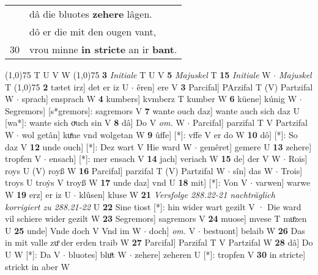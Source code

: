 \documentclass[8pt,a4paper,notitlepage]{article}
\begin{document}
\begin{table}[ht]
\begin{minipage}[t]{0.5\linewidth}
\begin{tabular}{rl}
 & dâ die bluotes \textbf{zehere} lâgen.\\ 
 & dô er die mit den ougen vant,\\ 
30 & vrou minne \textbf{in stricte} an ir \textbf{bant}.\\ 
\end{tabular}
\scriptsize
\line(1,0){75} \newline
T U V W \newline
\line(1,0){75} \newline
\textbf{3} \textit{Initiale} T U V  \textbf{5} \textit{Majuskel} T  \textbf{15} \textit{Initiale} W   $\cdot$ \textit{Majuskel} T  \newline
\line(1,0){75} \newline
\textbf{2} tætet irz] det er iz U  $\cdot$ êren] ere V \textbf{3} Parcifal] PArzifal T (V) Partzifal W  $\cdot$ sprach] ensprach W \textbf{4} kumbers] kvmberz T kumber W \textbf{6} küene] kúnig W  $\cdot$ Segremors] [s*gremors]: sagremors V \textbf{7} wante ouch daz] wante auch sich daz U [wa*]: wante sich oͮuch sin V \textbf{8} dâ] Do V \textit{om.} W  $\cdot$ Parcifal] parzifal T V Partzifal W  $\cdot$ wol getân] kuͤne vnd wolgetan W \textbf{9} ûffe] [*]: vffe V er do W \textbf{10} dô] [*]: So daz V \textbf{12} unde ouch] [*]: Dez wart V Hie ward W  $\cdot$ gemêret] gemere U \textbf{13} zehere] tropfen V  $\cdot$ ensach] [*]: mer ensach V \textbf{14} jach] veriach W \textbf{15} de] der V W  $\cdot$ Rois] roys U (V) royß W \textbf{16} Parcifal] parzifal T (V) Partzifal W  $\cdot$ sîn] das W  $\cdot$ Trois] troys U troẏs V troyß W \textbf{17} unde daz] vnd U \textbf{18} mit] [*]: Von V  $\cdot$ varwen] warwe W \textbf{19} erz] er iz U  $\cdot$ klûsen] kluse W \textbf{21} \textit{Versfolge 288.22-21 nachträglich korrigiert zu 288.21-22} U  \textbf{22} Sine tiost [*]: hin wider wart gezilt V · Die ward vil schiere wider gezilt W \textbf{23} Segremors] sagremors V \textbf{24} muose] mvese T muͦzen U \textbf{25} unde] Vnde doch V Vnd im W  $\cdot$ doch] \textit{om.} V  $\cdot$ bestuont] belaib W \textbf{26} Das in mit valle zuͦ der erden traib W \textbf{27} Parcifal] Parzifal T V Partzifal W \textbf{28} dâ] Do U W [*]: Da V  $\cdot$ bluotes] bluͦt W  $\cdot$ zehere] zeheren U [*]: tropfen V \textbf{30} in stricte] strickt in aber W \newline
\end{minipage}
\end{table}
\end{document}
